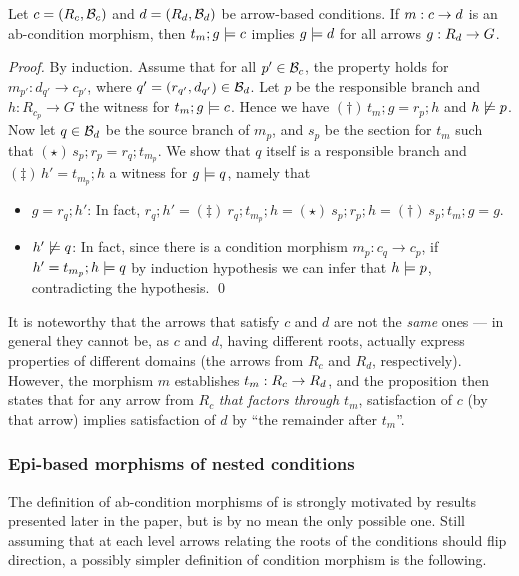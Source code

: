 \begin{proposition}
Let $c = (R_c, \mathcal{B}_c)$ and $d = (R_d, \mathcal{B}_d)$  be arrow-based conditions. If $m:c\rightarrow d$ is an ab-condition morphism, then $t_m;g\models c$ implies $g \models d$ for all arrows $g:R_d\rightarrow G$.
\end{proposition}
%
\emph{Proof.} By induction. Assume that for all $p'\in \mathcal{B}_c$, the property holds for $m_{p'}:d_{q'} \to c_{p'}$, where $q' = (r_{q'}, d_{q'}) \in \mathcal{B}_d$. Let $p$ be the responsible branch and $h: R_{c_{p}} \to G$ the witness for $t_m;g\models c$. 
Hence we have $(\dagger)\, t_m; g=r_{p};h$ and $h \not\models p$.  Now let $q \in \mathcal{B}_d$ be the source branch of $m_{p}$, and $s_p$ be the section for $t_m$ such that $(\star)\, s_p;r_p = r_q; t_{m_p}$. 
We show that $q$ itself is a responsible branch and $(\ddagger)\, h'=t_{m_p};h$ a witness for $g\models q$, namely that 
\begin{itemize}
\item $g = r_q;h'$: In fact, $r_q;h' =\!(\ddagger)\ r_q;t_{m_p};h =\!(\star)\ s_p;r_p; h  =\!(\dagger)\ s_p;t_m;g = g$. 
\item $h' \not\models q$: In fact, since there is a condition morphism $m_{p}: c_q \to c_p$, if $h'= t_{m_p};h \models q$ by induction hypothesis we can infer that $h \models p$, contradicting the hypothesis. \qed
\end{itemize}
%
It is noteworthy that the arrows that satisfy $c$ and $d$ are not the \emph{same} ones --- in general they cannot be, as $c$ and $d$, having different roots, actually express properties of different domains (the arrows from $R_c$ and $R_d$, respectively). However, the morphism $m$ establishes $t_m:R_c\rightarrow R_d$, and the proposition then states that for any arrow from $R_c$ \emph{that factors through $t_m$}, satisfaction of $c$ (by that arrow) implies satisfaction of $d$ by ``the remainder after $t_m$''.


\subsubsection{Epi-based morphisms of nested conditions}

The definition of ab-condition morphisms of  is strongly motivated by results presented later in the paper, but is by no mean the only possible one. Still assuming that at each level arrows relating the roots of the conditions should flip direction, a possibly simpler definition of condition morphism is the following.  

